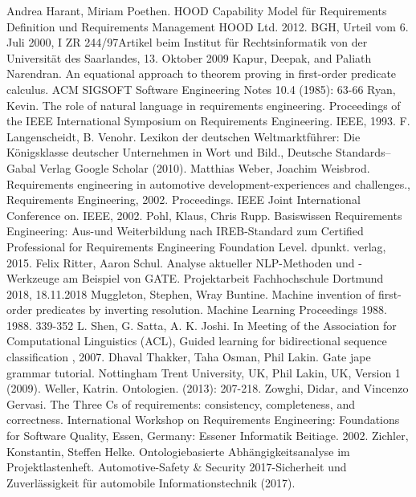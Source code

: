 \documentclass[12pt]{report}
\begin{document}
\begin{thebibliography}{20}
Andrea Harant, Miriam Poethen. \glqq HOOD Capability Model für Requirements Definition und Requirements Management \grqq{} HOOD Ltd. 2012.
BGH, \glqq Urteil vom 6. Juli 2000, I ZR 244/97\grqq Artikel beim Institut für Rechtsinformatik von der Universität des Saarlandes, 13. Oktober 2009
Kapur, Deepak, and Paliath Narendran. \glqq  An equational approach to theorem proving in first-order predicate calculus.\grqq{}  ACM SIGSOFT Software Engineering Notes 10.4 (1985): 63-66
Ryan, Kevin. \glqq The role of natural language in requirements engineering.\grqq{} Proceedings of the IEEE International Symposium on Requirements Engineering. IEEE, 1993.
F. Langenscheidt, B. Venohr. \glqq Lexikon der deutschen Weltmarktführer: Die Königsklasse deutscher Unternehmen in Wort und Bild.\grqq ,  Deutsche Standards–Gabal Verlag Google Scholar (2010).
Matthias Weber, Joachim Weisbrod. \glqq Requirements engineering in automotive development-experiences and challenges.\grqq , Requirements Engineering, 2002. Proceedings. IEEE Joint International Conference on. IEEE, 2002.
 Pohl, Klaus, Chris Rupp. \glqq Basiswissen Requirements Engineering: Aus-und Weiterbildung nach IREB-Standard zum Certified Professional for Requirements Engineering Foundation Level.\grqq{} dpunkt. verlag, 2015.
Felix Ritter, Aaron Schul. \glqq Analyse aktueller NLP-Methoden und -Werkzeuge am Beispiel von GATE.\grqq{} Projektarbeit Fachhochschule Dortmund 2018, 18.11.2018
Muggleton, Stephen, Wray Buntine. \glqq  Machine invention of first-order predicates by inverting resolution.\grqq{}  Machine Learning Proceedings 1988. 1988. 339-352
 L. Shen, G. Satta, A. K. Joshi. In Meeting of the Association for Computational Linguistics (ACL), \glqq  Guided learning for bidirectional sequence classification\grqq{} , 2007.
Dhaval Thakker, Taha Osman, Phil Lakin. \glqq Gate jape grammar tutorial.\grqq{} Nottingham Trent University, UK, Phil Lakin, UK, Version 1 (2009).
 Weller, Katrin. \glqq Ontologien.\grqq{} (2013): 207-218.
 Zowghi, Didar, and Vincenzo Gervasi. \glqq The Three Cs of requirements: consistency, completeness, and correctness.\grqq{} International Workshop on Requirements Engineering: Foundations for Software Quality, Essen, Germany: Essener Informatik Beitiage. 2002.
 Zichler, Konstantin, Steffen Helke. \glqq Ontologiebasierte Abhängigkeitsanalyse im Projektlastenheft.\grqq{} Automotive-Safety \& Security 2017-Sicherheit und Zuverlässigkeit für automobile Informationstechnik (2017).



\end{thebibliography}
\end{document}
